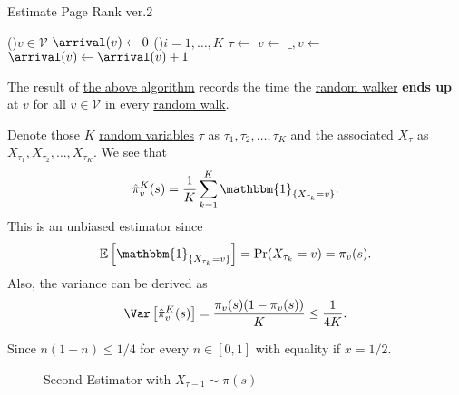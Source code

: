 \begin{algorithm}[H]\label{algo:Monte-Carlo-algorithm-2}
	\DontPrintSemicolon
	\caption{Estimate Page Rank ver.2}

	\BlankLine

	\For(){\(v\in \mathcal{V} \)}{
		\(\arrival(v)\gets 0\)\;
	}
	\;
	\For(){\(i = 1, \dots, K\)}{
		\(\tau \gets \) 
		\(v\gets \)
		\(\_, v\gets\)
		\(\arrival(v)\gets \arrival(v) + 1\)
	}
	\Return{\arrival}\;
\end{algorithm}
\begin{note}
	The result of \hyperref[algo:Monte-Carlo-algorithm-2]{the above algorithm} records the time the \hyperref[def:random-walker]{random walker} \textbf{ends up} at \(v\) for all \(v\in \mathcal{V} \) in every \hyperref[algo:random-walk-algorithm]{random walk}.
\end{note}

Denote those \(K\) \hyperref[def:random-variable]{random variables} \(\tau\) as \(\tau_1, \tau_2, \dots , \tau_K\) and the associated \(X_{\tau}\) as \(X_{\tau_1}, X_{\tau_2}, \dots , X_{\tau_K}\). We see that
\[
	\hat{\pi}_v^K(s) = \frac{1}{K}\sum\limits_{k=1}^{K} \mathbbm{1}_{\{X_{\tau_k} = v\}}.
\]
This is an unbiased estimator since
\[
	\mathbb{E}\left[\mathbbm{1}_{\{X_{\tau_k}=v\}}\right] = \Pr(X_{\tau_k} = v) = \pi_v(s).
\]
Also, the variance can be derived as
\[
	\Var\left[\hat{\pi}_v^K(s) \right] = \frac{\pi_v(s)(1 - \pi_v(s))}{K}\leq \frac{1}{4K}.
\]

\begin{remark}
	Since \(n(1-n)\leq 1/4\) for every \(n\in[0, 1]\) with equality if \(x = 1/2\).
\end{remark}

\begin{figure}[H]
	\centering
	\caption{Second Estimator with \(X_{\tau-1}\sim\pi(s)\)}
	\label{fig:Monte-Carlo-Estimator-2}
\end{figure}

